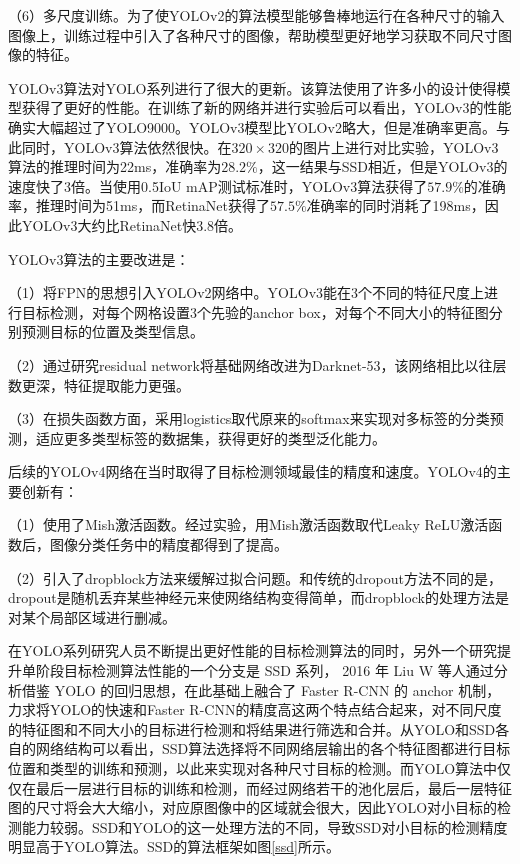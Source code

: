 （6）多尺度训练。为了使YOLOv2的算法模型能够鲁棒地运行在各种尺寸的输入图像上，训练过程中引入了各种尺寸的图像，帮助模型更好地学习获取不同尺寸图像的特征。

YOLOv3算法对YOLO系列进行了很大的更新。该算法使用了许多小的设计使得模型获得了更好的性能。在训练了新的网络并进行实验后可以看出，YOLOv3的性能确实大幅超过了YOLO9000。YOLOv3模型比YOLOv2略大，但是准确率更高。与此同时，YOLOv3算法依然很快。在$320\times320$的图片上进行对比实验，YOLOv3算法的推理时间为22ms，准确率为$28.2\%$，这一结果与SSD相近，但是YOLOv3的速度快了3倍。当使用0.5IoU mAP测试标准时，YOLOv3算法获得了$57.9\%$的准确率，推理时间为51ms，而RetinaNet获得了$57.5\%$准确率的同时消耗了198ms，因此YOLOv3大约比RetinaNet快3.8倍。

YOLOv3算法的主要改进是：

（1）将FPN的思想引入YOLOv2网络中。YOLOv3能在3个不同的特征尺度上进行目标检测，对每个网格设置3个先验的anchor box，对每个不同大小的特征图分别预测目标的位置及类型信息。

（2）通过研究residual network将基础网络改进为Darknet-53，该网络相比以往层数更深，特征提取能力更强。

（3）在损失函数方面，采用logistics取代原来的softmax来实现对多标签的分类预测，适应更多类型标签的数据集，获得更好的类型泛化能力。

后续的YOLOv4网络在当时取得了目标检测领域最佳的精度和速度。YOLOv4的主要创新有：

（1）使用了Mish激活函数。经过实验，用Mish激活函数取代Leaky ReLU激活函数后，图像分类任务中的精度都得到了提高。

（2）引入了dropblock方法\cite{ghiasi2018dropblock}来缓解过拟合问题。和传统的dropout方法不同的是，dropout是随机丢弃某些神经元来使网络结构变得简单，而dropblock的处理方法是对某个局部区域进行删减。

在YOLO系列研究人员不断提出更好性能的目标检测算法的同时，另外一个研究提升单阶段目标检测算法性能的一个分支是 SSD 系列， 2016 年 Liu W 等人通过分析借鉴 YOLO 的回归思想，在此基础上融合了 Faster R-CNN 的 anchor 机制，力求将YOLO的快速和Faster R-CNN的精度高这两个特点结合起来，对不同尺度的特征图和不同大小的目标进行检测和将结果进行筛选和合并。从YOLO和SSD各自的网络结构可以看出，SSD算法选择将不同网络层输出的各个特征图都进行目标位置和类型的训练和预测，以此来实现对各种尺寸目标的检测。而YOLO算法中仅仅在最后一层进行目标的训练和检测，而经过网络若干的池化层后，最后一层特征图的尺寸将会大大缩小，对应原图像中的区域就会很大，因此YOLO对小目标的检测能力较弱。SSD和YOLO的这一处理方法的不同，导致SSD对小目标的检测精度明显高于YOLO算法。SSD的算法框架如图\ref{ssd}所示。

